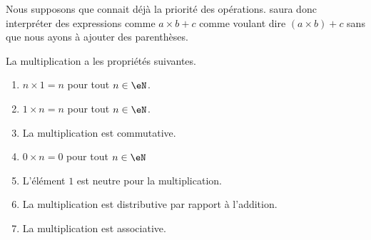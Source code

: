 \begin{normaltext}
    Nous supposons que  connait déjà la priorité des opérations.  saura donc interpréter des expressions comme \( a\times b+c\) comme voulant dire \( (a\times b)+c\) sans que nous ayons à ajouter des parenthèses.
\end{normaltext}

\begin{proposition}     \label{PROPooGHDOooFYRmon}
    La multiplication a les propriétés suivantes.
    \begin{enumerate}
        \item       \label{ITEMooHFWRooDCEpjj}
            \( n\times 1=n\) pour tout \( n\in \eN\).
        \item       \label{ITEMooRSYMooSUrRsl}
            \( 1\times n=n\) pour tout \( n\in \eN\).
        \item       \label{ITEMooWJPOooRUYjwQ}
            La multiplication est commutative.
        \item       \label{ITEMooNBYKooXnGRrf}
            \( 0\times n=0\) pour tout \( n\in \eN\)
        \item      \label{ITEMooLJQBooVpUxUv}
            L'élément \( 1\) est neutre pour la multiplication.
        \item       \label{ITEMooDYLIooETIBEL}
            La multiplication est distributive par rapport à l'addition.
        \item       \label{ITEMooQBFSooWGDQYX}
            La multiplication est associative.
    \end{enumerate}
\end{proposition}

